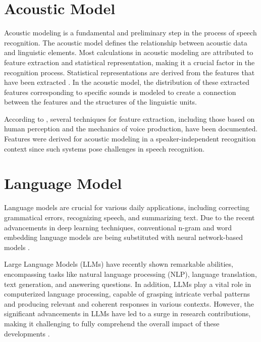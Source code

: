 \section{Acoustic Model}
\label{sec:AcousticModel}
Acoustic modeling is a fundamental and preliminary step in the process of speech recognition. The acoustic model defines the relationship between acoustic data and linguistic elements. Most calculations in acoustic modeling are attributed to feature extraction and statistical representation, making it a crucial factor in the recognition process. Statistical representations are derived from the features that have been extracted . In the acoustic model, the distribution of these extracted features corresponding to specific sounds is modeled to create a connection between the features and the structures of the linguistic units. 

According to , several techniques for feature extraction, including those based on human perception and the mechanics of voice production, have been documented. Features were derived for acoustic modeling in a speaker-independent recognition context since such systems pose challenges in speech recognition.

\section{Language Model}
\label{sec:LanguageModel}
Language models are crucial for various daily applications, including correcting grammatical errors, recognizing speech, and summarizing text. Due to the recent advancements in deep learning techniques, conventional n-gram and word embedding language models are being substituted with neural network-based models .

Large Language Models (LLMs) have recently shown remarkable abilities, encompassing tasks like natural language processing (NLP), language translation, text generation, and answering questions. In addition, LLMs play a vital role in computerized language processing, capable of grasping intricate verbal patterns and producing relevant and coherent responses in various contexts. However, the significant advancements in LLMs have led to a surge in research contributions, making it challenging to fully comprehend the overall impact of these developments .

